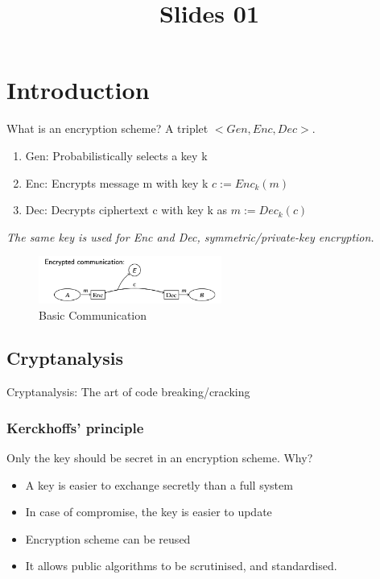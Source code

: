 \documentclass[12pt]{article}   	%
\title{Slides 01}
\begin{document}
\maketitle
\tableofcontents
\newpage
\section{Introduction}
What is an encryption scheme? A triplet  $<Gen,Enc,Dec>.$
\begin{enumerate}
\item Gen: Probabilistically selects a key k
\item Enc: Encrypts message m with key k $c := Enc_k(m)$
\item Dec: Decrypts ciphertext c with key k as $m := Dec_k(c)$
\end{enumerate}
\emph{The same key is used for Enc and Dec, symmetric/private-key encryption.}
\begin{figure}[ht]
    \centering
    \includegraphics[width=6cm]{figures/f1.png}
    \caption{Basic Communication}
\end{figure}
\subsection{Cryptanalysis}
Cryptanalysis: The art of code breaking/cracking
\subsubsection{Kerckhoffs' principle}
Only the key should be secret in an encryption scheme. Why?
\begin{itemize}
\item A key is easier to exchange secretly than a full system
\item In case of compromise, the key is easier to update
\item Encryption scheme can be reused
\item It allows public algorithms to be scrutinised, and standardised.
\end{itemize}
\end{document}
